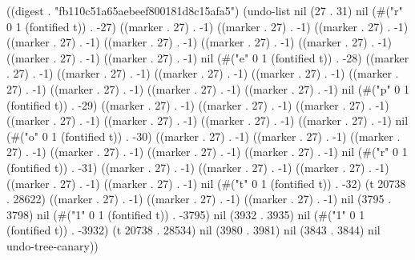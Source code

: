 
((digest . "fb110c51a65aebeef800181d8c15afa5") (undo-list nil (27 . 31) nil (#("r" 0 1 (fontified t)) . -27) ((marker . 27) . -1) ((marker . 27) . -1) ((marker . 27) . -1) ((marker . 27) . -1) ((marker . 27) . -1) ((marker . 27) . -1) ((marker . 27) . -1) ((marker . 27) . -1) ((marker . 27) . -1) nil (#("e" 0 1 (fontified t)) . -28) ((marker . 27) . -1) ((marker . 27) . -1) ((marker . 27) . -1) ((marker . 27) . -1) ((marker . 27) . -1) ((marker . 27) . -1) ((marker . 27) . -1) ((marker . 27) . -1) nil (#("p" 0 1 (fontified t)) . -29) ((marker . 27) . -1) ((marker . 27) . -1) ((marker . 27) . -1) ((marker . 27) . -1) ((marker . 27) . -1) ((marker . 27) . -1) ((marker . 27) . -1) nil (#("o" 0 1 (fontified t)) . -30) ((marker . 27) . -1) ((marker . 27) . -1) ((marker . 27) . -1) ((marker . 27) . -1) ((marker . 27) . -1) ((marker . 27) . -1) nil (#("r" 0 1 (fontified t)) . -31) ((marker . 27) . -1) ((marker . 27) . -1) ((marker . 27) . -1) ((marker . 27) . -1) ((marker . 27) . -1) nil (#("t" 0 1 (fontified t)) . -32) (t 20738 . 28622) ((marker . 27) . -1) ((marker . 27) . -1) ((marker . 27) . -1) nil (3795 . 3798) nil (#("1" 0 1 (fontified t)) . -3795) nil (3932 . 3935) nil (#("1" 0 1 (fontified t)) . -3932) (t 20738 . 28534) nil (3980 . 3981) nil (3843 . 3844) nil undo-tree-canary))
